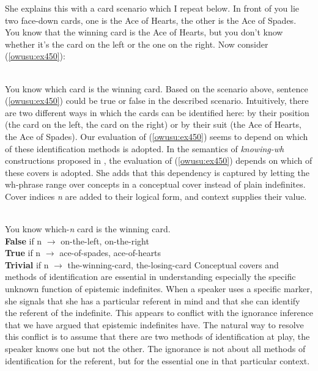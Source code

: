 \documentclass[output=paper,modfonts,nonflat,draftmode]{langsci/langscibook}
\begin{document}
She explains this with a card scenario which I repeat below.
 In front of you lie two face-down cards, one is the Ace of Hearts, the other is the Ace of Spades. You know that the winning card is the Ace of Hearts, but you don’t know whether it’s the card on the left or the one on the right. Now consider (\ref{owusu:ex450}):

\ea\label{owusu:ex450}\\
 You know which card is the winning card.
\z Based on the scenario above, sentence (\ref{owusu:ex450}) could be true or false in the described scenario. Intuitively, there are two different ways in which the cards can be identified here: by their position (the card on the left, the card on the right) or by their suit (the Ace of Hearts, the Ace of Spades). Our evaluation of (\ref{owusu:ex450}) seems to depend on which of these identification methods is adopted. In the semantics of \emph{knowing-wh} constructions proposed in \citet{Aloni2001}, the evaluation of (\ref{owusu:ex450}) depends on which of these covers is adopted. She adds that this dependency is captured by letting the wh-phrase range over concepts in a conceptual cover instead of plain indefinites. Cover indices \emph{n} are added to their logical form, and context supplies their value. 


\ea\label{owusu:ex45}\\
 You know which-\emph{n} card is the winning card.\\
 \textbf{False} if n $\longrightarrow$ {on-the-left, on-the-right}\\
 \textbf{True} if n $\longrightarrow$ {ace-of-spades, ace-of-hearts} \\
 \textbf{Trivial} if n $\longrightarrow$ {the-winning-card, the-losing-card}
\z 
Conceptual covers and methods of identification are essential in understanding especially the specific unknown function of epistemic indefinites. When a speaker uses a specific marker, she signals that she has a particular referent in mind and that she can identify the referent of the indefinite. This appears to conflict with the ignorance inference that we have argued that epistemic indefinites have. The natural way to resolve this conflict is to assume that there are two methods of identification at play, the speaker knows one but not the other. The ignorance is not about all methods of identification for the referent, but for the essential one in that particular context.  
\end{document}
